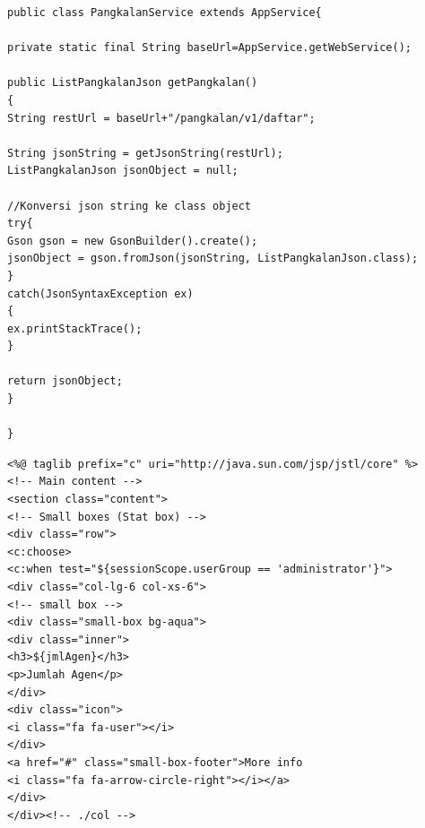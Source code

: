 
\begin{lstlisting}[caption=Potongan kode \textit{model} aplikasi berbasis web, label=modelWeb]
public class PangkalanService extends AppService{

private static final String baseUrl=AppService.getWebService();

public ListPangkalanJson getPangkalan()
{
String restUrl = baseUrl+"/pangkalan/v1/daftar";

String jsonString = getJsonString(restUrl);
ListPangkalanJson jsonObject = null;

//Konversi json string ke class object
try{
Gson gson = new GsonBuilder().create();
jsonObject = gson.fromJson(jsonString, ListPangkalanJson.class);            
}
catch(JsonSyntaxException ex)
{
ex.printStackTrace();
}

return jsonObject;
}

}

\end{lstlisting}

\begin{lstlisting}[caption=Potongan kode \textit{view} aplikasi berbasis web, label=viewWeb]
<%@ taglib prefix="c" uri="http://java.sun.com/jsp/jstl/core" %>
<!-- Main content -->
<section class="content">
<!-- Small boxes (Stat box) -->
<div class="row">
<c:choose>
<c:when test="${sessionScope.userGroup == 'administrator'}">
<div class="col-lg-6 col-xs-6">
<!-- small box -->
<div class="small-box bg-aqua">
<div class="inner">
<h3>${jmlAgen}</h3>
<p>Jumlah Agen</p>
</div>
<div class="icon">
<i class="fa fa-user"></i>
</div>
<a href="#" class="small-box-footer">More info 
<i class="fa fa-arrow-circle-right"></i></a>
</div>
</div><!-- ./col -->

\end{lstlisting}


